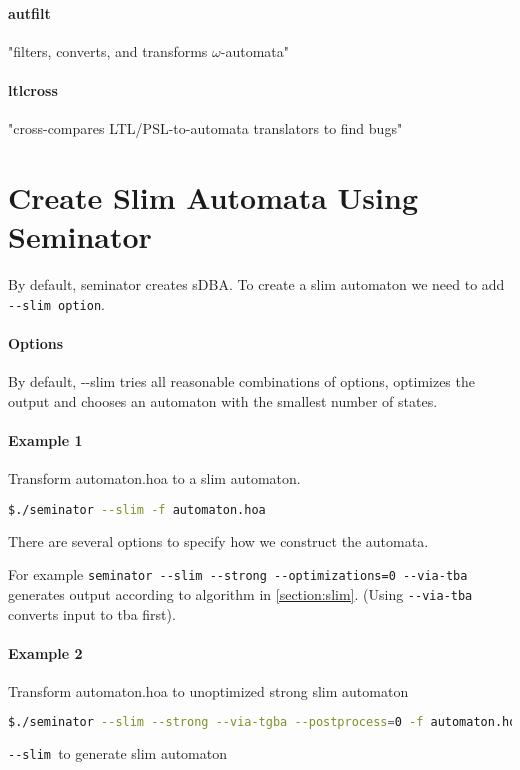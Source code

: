 \documentclass[
	digital,
nolof, nolot
]{fithesis3}
\begin{document}
	\paragraph{autfilt} "filters, converts, and transforms $\omega$-automata"  \cite{spot}
	\paragraph{ltlcross} "cross-compares LTL/PSL-to-automata translators to find bugs" \cite{spot}
		\section{Create Slim Automata Using Seminator}
		By default, seminator creates sDBA. To create a slim automaton we need to add \texttt{-{}-slim option}. 
		\paragraph{Options} By default, -{}-slim tries all reasonable combinations of options, optimizes the output and chooses an automaton with the smallest number of states.
		
		\paragraph{Example 1}
		Transform automaton.hoa to a slim automaton.

		\begin{lstlisting}[language=bash]
$./seminator --slim -f automaton.hoa
		\end{lstlisting}
		
		There are several options to specify how we construct the automata.
		
		For example \texttt{seminator -{}-slim -{}-strong -{}-optimizations=0 -{}-via-tba} generates output according to algorithm in \ref{section:slim}. (Using \texttt{-{}-via-tba} converts input to tba first).
		
		
		\paragraph{Example 2}
		Transform automaton.hoa to unoptimized strong slim automaton
		\begin{lstlisting}[language=bash]
$./seminator --slim --strong --via-tgba --postprocess=0 -f automaton.hoa
		\end{lstlisting}
		
		 
		
		\texttt{-{}-slim }to generate slim automaton
		
\end{document}
